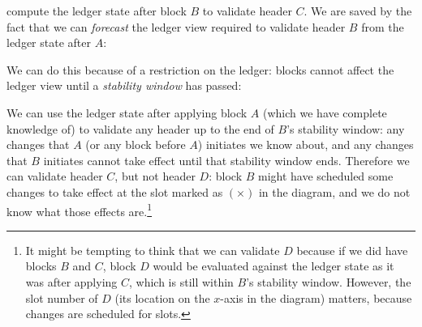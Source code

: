compute the ledger state after block $B$ to validate header $C$. We are saved by
the fact that we can \emph{forecast} the ledger view  required to validate
header $B$ from the ledger state after $A$:
%
\begin{center}
\end{center}
%
We can do this because of a restriction on the ledger: blocks cannot affect
the ledger view until a \emph{stability window} has passed:
%
\begin{center}
\end{center}
%
We can use the ledger state after applying block $A$ (which we
have complete knowledge of) to validate any header up to the end of $B$'s
stability window: any changes that $A$ (or any block before $A$)
initiates we know about, and any changes that $B$ initiates cannot take effect
until that stability window ends. Therefore we can validate header $C$, but not
header $D$: block $B$ might have scheduled some changes to take effect at the
slot marked as $(\times)$ in the diagram, and we do not know what those effects
are.\footnote{It might be tempting to think that we can validate $D$ because if
we did have blocks $B$ and $C$, block $D$ would be evaluated against the ledger
state as it was after applying $C$, which is still within $B$'s stability
window. However, the slot number of $D$ (its location on the $x$-axis in the
diagram) matters, because changes are scheduled for slots.}

